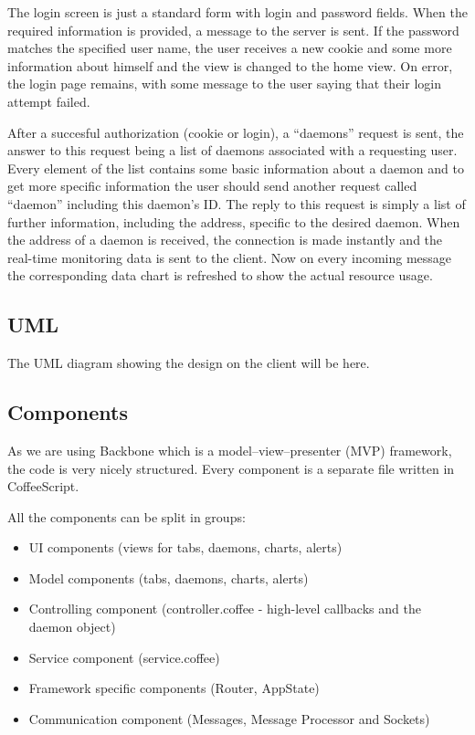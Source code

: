 \documentclass{l3proj}
\begin{document}
The login screen is just a standard form with login and password fields. When the required information is provided, a message to the server is sent. If the password matches the specified user name, the user receives a new cookie and some more information about himself and the view is changed to the home view. On error, the login page remains, with some message to the user saying that their login attempt failed.

After a succesful authorization (cookie or login), a ``daemons'' request is sent, the answer to this request being a list of daemons associated with a requesting user. Every element of the list contains some basic information about a daemon and to get more specific information the user should send another request called ``daemon'' including this daemon's ID. The reply to this request is simply a list of further information, including the address, specific to the desired daemon. When the address of a daemon is received, the connection is made instantly and the real-time monitoring data is sent to the client. Now on every incoming message the corresponding data chart is refreshed to show the actual resource usage.

\subsection{UML}

The UML diagram showing the design on the client will be here.

\subsection{Components}

As we are using Backbone which is a model–view–presenter (MVP) framework, the code is very nicely structured. Every component is a separate file written in CoffeeScript.

All the components can be split in groups:
\begin{itemize}
  \item UI components (views for tabs, daemons, charts, alerts)
  \item Model components (tabs, daemons, charts, alerts)
  \item Controlling component (controller.coffee - high-level callbacks and the daemon object)
  \item Service component (service.coffee)
  \item Framework specific components (Router, AppState)
  \item Communication component (Messages, Message Processor and Sockets)
\end{itemize}
\end{document}
